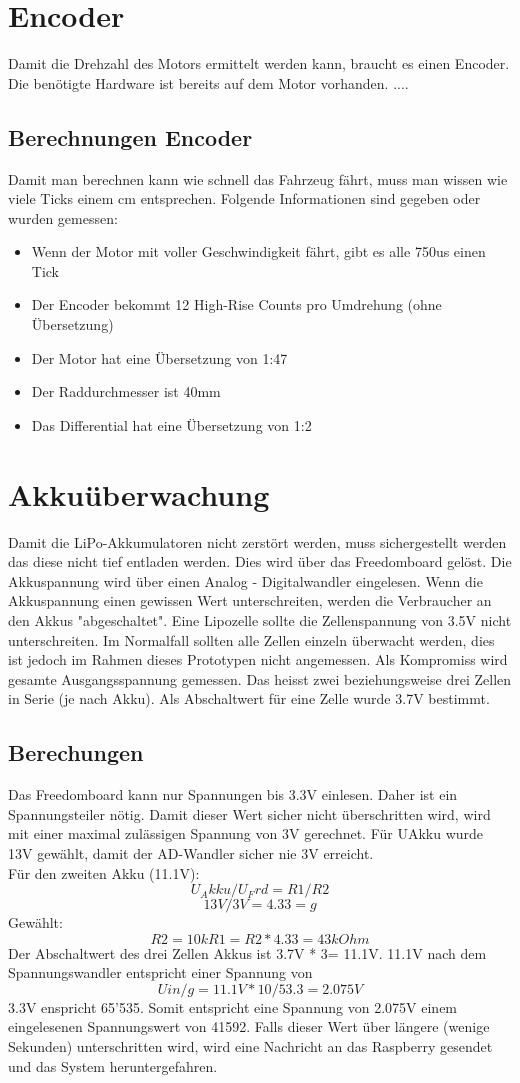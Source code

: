 \documentclass[a4paper, 10pt, fleqn]{article}
\begin{document}

\tableofcontents
\clearpage
\newpage
\section{Encoder}
Damit die Drehzahl des Motors ermittelt werden kann, braucht es einen Encoder. Die benötigte Hardware ist bereits auf dem Motor vorhanden. ....
\subsection{Berechnungen Encoder}
Damit man berechnen kann wie schnell das Fahrzeug fährt, muss man wissen wie viele Ticks einem cm entsprechen.
Folgende Informationen sind gegeben oder wurden gemessen:
\begin{itemize}
\item Wenn der Motor mit voller Geschwindigkeit fährt, gibt es alle 750us einen Tick
\item Der Encoder bekommt 12 High-Rise Counts pro Umdrehung (ohne Übersetzung)
\item Der Motor hat eine Übersetzung von 1:47
\item Der Raddurchmesser ist 40mm
\item Das Differential hat eine Übersetzung von 1:2
\end{itemize}

\section{Akkuüberwachung}
Damit die LiPo-Akkumulatoren nicht zerstört werden, muss sichergestellt werden das diese nicht tief entladen werden. Dies wird über das Freedomboard gelöst. Die Akkuspannung wird über einen Analog - Digitalwandler eingelesen. Wenn die Akkuspannung einen gewissen Wert unterschreiten, werden die Verbraucher an den Akkus "abgeschaltet". Eine Lipozelle sollte die Zellenspannung von 3.5V nicht unterschreiten. Im Normalfall sollten alle Zellen einzeln überwacht werden, dies ist jedoch im Rahmen dieses Prototypen nicht angemessen. Als Kompromiss wird gesamte Ausgangsspannung gemessen. Das heisst zwei beziehungsweise drei Zellen in Serie (je nach Akku). Als Abschaltwert für eine Zelle wurde 3.7V bestimmt.
\subsection{Berechungen}
Das Freedomboard kann nur Spannungen bis 3.3V einlesen. Daher ist ein Spannungsteiler nötig. Damit dieser Wert sicher nicht überschritten wird, wird mit einer maximal zulässigen Spannung von 3V gerechnet. Für UAkku wurde 13V gewählt, damit der AD-Wandler sicher nie 3V erreicht.\\
Für den zweiten Akku (11.1V):
\[	U_Akku/U_Frd=R1/R2\]
\[	13V/3V=4.33=g\]
Gewählt:
\[	R2=10k R1=R2*4.33=43kOhm\]
Der Abschaltwert des drei Zellen Akkus ist 3.7V * 3= 11.1V.
11.1V nach dem Spannungswandler entspricht einer Spannung von \[Uin/g=11.1V*10/53.3=2.075V\]
3.3V enspricht 65'535. Somit entspricht eine Spannung von 2.075V einem eingelesenen Spannungswert von 41592. Falls dieser Wert über längere (wenige Sekunden) unterschritten wird, wird eine Nachricht an das Raspberry gesendet und das System heruntergefahren.
\end{document}

